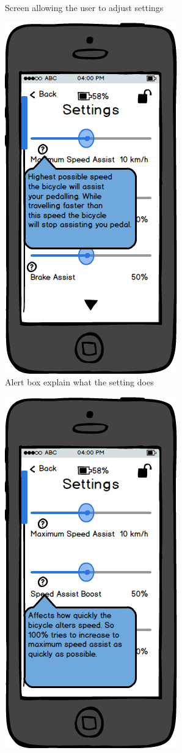 \documentclass[a4paper]{report}
\begin{document}
{\begin{figure}
\caption{Screen allowing the user to adjust settings}
\end{figure}
\clearpage
\begin{figure}
\centering
\includegraphics[scale=0.9]{figures/prototype_1/settings_help_1}
\caption{Alert box explain what the setting does}
\end{figure}
\clearpage
\begin{figure}
\centering
\includegraphics[scale=0.9]{figures/prototype_1/settings_help_2}

\end{figure}}
\end{document}
